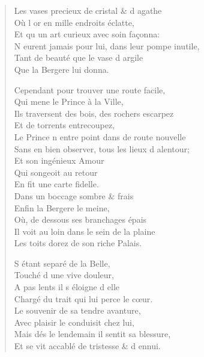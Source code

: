 \begin{verse}
Les vases precieux de cristal \& d\textquotesingle{} agathe \\
\vin Où l\textquotesingle{} or en mille endroits éclatte, \\
Et qu\textquotesingle{} un art curieux avec soin façonna: \\
N\textquotesingle{} eurent jamais pour lui, dans leur pompe inutile, \\
\vin Tant de beauté que le vase d\textquotesingle{} argile \\
\vin Que la Bergere lui donna.

Cependant pour trouver une route facile, \\
\vin Qui mene le Prince à la Ville, \\
Ils traversent des bois, des rochers escarpez \\
\vin Et de torrents entrecoupez, \\
Le Prince n\textquotesingle{} entre point dans de route nouvelle \\
Sans en bien observer, tous les lieux d\textquotesingle{} alentour; \\
\vin Et son ingénieux Amour \\
\vin\vin Qui songeoit au retour \\
\vin En fit une carte fidelle. \\
\vin Dans un boccage sombre \& frais \\
\vin Enfin la Bergere le meine, \\
\vin Où, de dessous ses branchages épais \\
\vin Il voit au loin dans le sein de la plaine \\
\vin Les toits dorez de son riche Palais.

\vin S\textquotesingle{} étant separé de la Belle, \\
\vin Touché d\textquotesingle{} une vive douleur, \\
\vin A pas lents il s\textquotesingle{} éloigne d\textquotesingle{} elle \\
\vin Chargé du trait qui lui perce le cœur. \\
\vin Le souvenir de sa tendre avanture, \\
\vin Avec plaisir le conduisit chez lui, \\
Mais dés le lendemain il sentit sa blessure, \\
Et se vit accablé de tristesse \& d\textquotesingle{} ennui.


\end{verse}
